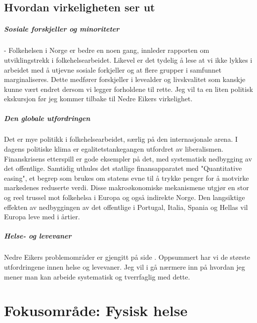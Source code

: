 \documentclass[12pt]{memoir} %
\begin{document}
	\section{Hvordan virkeligheten ser ut}
		\paragraph{Sosiale forskjeller og minoriteter\\}
			- Folkehelsen i Norge er bedre en noen gang, innleder rapporten om utviklingstrekk i folkehelsearbeidet\cite{Utvtrekk}. Likevel er det tydelig å lese at vi ikke lykkes i arbeidet med å utjevne sosiale forkjeller og at flere grupper i samfunnet marginaliseres. Dette medfører forskjeller i levealder og livskvalitet som kanskje kunne vært endret dersom vi legger forholdene til rette. Jeg vil ta en liten politisk ekskursjon før jeg kommer tilbake til Nedre Eikers virkelighet.

		\paragraph{Den globale utfordringen\\}
			Det er mye politikk i folkehelsearbeidet, særlig på den internasjonale arena. I dagens politiske klima er egalitetstankegangen utfordret av liberalismen. Finanskrisens etterspill er gode eksempler på det, med systematisk nedbygging av det offentlige. Samtidig uthules det statlige finansapparatet med "Quantitative easing", et begrep som brukes om statens evne til å trykke penger for å motvirke markedenes reduserte verdi. Disse makroøkonomiske mekanismene utgjør en stor og reel trussel mot folkehelsa i Europa og også indirekte Norge. Den langsiktige effekten av nedbyggingen av det offentlige i Portugal, Italia, Spania og Hellas vil Europa leve med i årtier. 

		\paragraph{Helse- og levevaner\\}
			Nedre Eikers problemområder er gjengitt på side \pageref{fhprofilnekbilde}. Oppsummert har vi de største utfordringene innen helse og levevaner. Jeg vil i  gå nærmere inn på hvordan jeg mener man kan arbeide systematisk og tverrfaglig med dette. 

\chapter{Fokusområde: Fysisk helse}\label{chap:fok}
\end{document}

